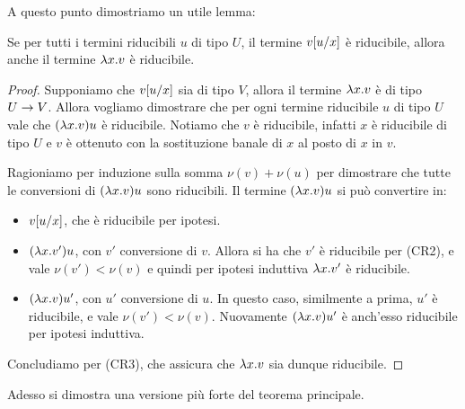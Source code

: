\documentclass[]{marticle}
\begin{document}
A questo punto dimostriamo un utile lemma:
\begin{block}[Lemma]
    \label{red_abs}
    Se per tutti i termini riducibili $u$ di tipo $U$, il termine $v[u/x]$
    \`e riducibile, allora anche il termine $\lambda x.v$ \`e riducibile.
\end{block}
\begin{proof}
    Supponiamo che $v[u/x]$ sia di tipo $V$, allora il termine $\lambda x.v$ \`e
    di tipo $U\rightarrow V$. Allora vogliamo dimostrare che per ogni termine
    riducibile $u$ di tipo $U$ vale che $(\lambda x.v)u$ \`e riducibile. Notiamo che
    $v$ \`e riducibile, infatti $x$ \`e riducibile di tipo $U$ e $v$ \`e
    ottenuto con la sostituzione banale di $x$ al posto di $x$ in $v$.

    Ragioniamo per induzione sulla somma $\nu(v)+\nu(u)$ per dimostrare che
    tutte le conversioni di $(\lambda x.v)u$ sono riducibili. Il termine $(\lambda x.v)u$
    si pu\`o convertire in:
    \begin{itemize}
        \item $v[u/x]$, che \`e riducibile per ipotesi.
        \item $(\lambda x. v')u$, con $v'$ conversione di $v$. Allora si ha che $v'$
            \`e riducibile per (CR2), e vale $\nu(v')<\nu(v)$ e quindi per
            ipotesi induttiva $\lambda x. v'$ \`e riducibile.
        \item $(\lambda x. v)u'$, con $u'$ conversione di $u$. In questo caso,
            similmente a prima, $u'$ \`e riducibile, e vale $\nu(v')<\nu(v)$.
            Nuovamente $(\lambda x. v)u'$ \`e anch'esso riducibile per ipotesi
            induttiva.
    \end{itemize}
    Concludiamo per (CR3), che assicura che $\lambda x.v$ sia dunque riducibile.
\end{proof}

Adesso si dimostra una versione pi\`u forte del teorema principale.
\end{document}
